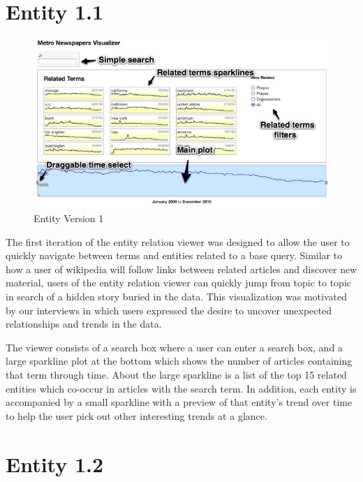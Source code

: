 \section{Entity 1.1}

\begin{figure}[htb]
  \centerline{
    \includegraphics[scale=0.37]{figures/relation-0.jpg}
  }
  \caption{Entity Version 1}
  \label{fig:explorer-0}
\end{figure}

The first iteration of the entity relation viewer was designed to allow the user to quickly navigate between terms and entities related to a base query. Similar to how a user of wikipedia will follow links between related articles and discover new material, users of the entity relation viewer can quickly jump from topic to topic in search of a hidden story buried in the data. This visualization was motivated by our interviews in which users expressed the desire to uncover unexpected relationships and trends in the data.

The viewer consists of a search box where a user can enter a search box, and a large sparkline plot at the bottom which shows the number of articles containing that term through time. About the large sparkline is a list of the top 15 related entities which co-occur in articles with the search term. In addition, each entity is accompanied by a small sparkline with a preview of that entity's trend over time to help the user pick out other interesting trends at a glance.

\section{Entity 1.2}


